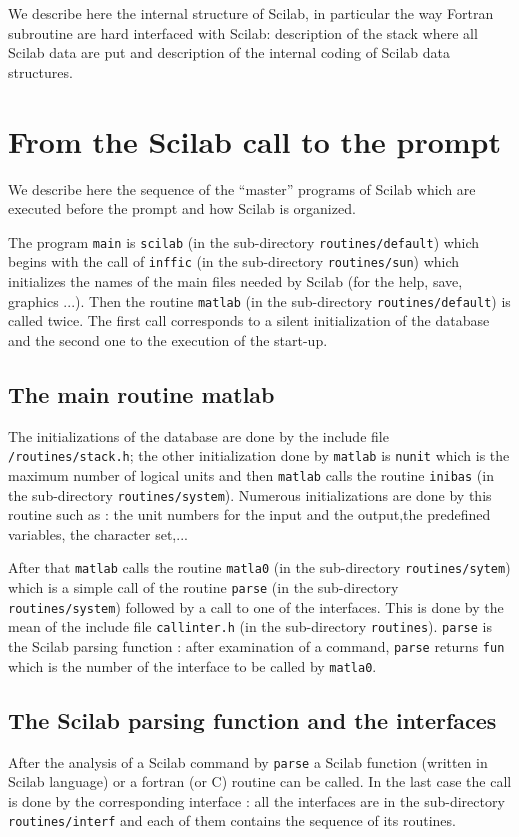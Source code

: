 We describe here the internal structure of Scilab, in particular the way
Fortran subroutine are hard interfaced with Scilab: description of the stack 
where all Scilab data are put and description of the internal coding of
Scilab data structures.

\section{From the Scilab call to the prompt}
We describe here the sequence of the ``master'' programs of Scilab which are
executed before the prompt and how Scilab is organized.

The program {\tt main} is {\tt scilab} (in the sub-directory 
{\tt routines/default}) which  begins with the call of {\tt inffic} 
(in the sub-directory {\tt routines/sun}) which initializes the names of the 
main files
needed by Scilab (for the help, save, graphics ...). Then the routine 
{\tt matlab} (in the sub-directory {\tt routines/default}) is called 
twice. The first call corresponds to a silent initialization of the database
and the second one to the execution of the start-up.

\subsection{The main routine matlab}
The initializations of the database are done by the include file\\
{\tt <scilab dir>/routines/stack.h}; the other initialization done by 
{\tt matlab} is {\tt nunit} which is the maximum number of logical units and 
then {\tt matlab} calls the routine {\tt inibas} (in the sub-directory
{\tt routines/system}). Numerous initializations are done by this routine
such as : the unit numbers for the input and the output,the predefined 
variables, the character set,...

After that {\tt matlab} calls the routine {\tt matla0} (in the sub-directory
{\tt routines/sytem}) which is a simple call of the routine {\tt parse} (in
the sub-directory {\tt routines/system}) followed by a call to one of the interfaces. This is done by the mean of the include file 
{\tt callinter.h} (in the sub-directory {\tt routines}). {\tt parse} is the
Scilab parsing function : after examination of a command, {\tt parse} returns
{\tt fun} which is the number of the interface to be called by {\tt matla0}.

\subsection{The Scilab parsing function and the interfaces}
After the analysis of a Scilab command by {\tt parse} a Scilab function
(written in Scilab language) or a fortran (or C) routine can be called.
In the last case the call is done by the corresponding interface : all the
interfaces are in the sub-directory {\tt routines/interf} and each of them 
contains the sequence of its routines.

